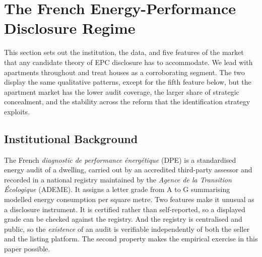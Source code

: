%

\section{The French Energy-Performance Disclosure Regime}
\label{sec:setting}

This section sets out the institution, the data, and five features of the market that any
candidate theory of EPC disclosure has to accommodate. We lead with apartments throughout and
treat houses as a corroborating segment. The two display the same qualitative patterns, except for the fifth feature below, but the
apartment market has the lower audit coverage, the larger share of strategic concealment, and the
stability across the reform that the identification strategy exploits.

\subsection{Institutional Background}
\label{ss:institutions}

The French \emph{diagnostic de performance \'energ\'etique} (DPE) is a standardised energy audit of
a dwelling, carried out by an accredited third-party assessor and recorded in a national registry
maintained by the \emph{Agence de la Transition \'Ecologique} (ADEME). It assigns a letter grade
from A to G summarising modelled energy consumption per square metre. Two features make it
unusual as a disclosure instrument. It is certified rather than self-reported, so a displayed
grade can be checked against the registry. And the registry is centralised and public, so the
\emph{existence} of an audit is verifiable independently of both the seller and the listing
platform. The second property makes the empirical exercise in this paper possible.

